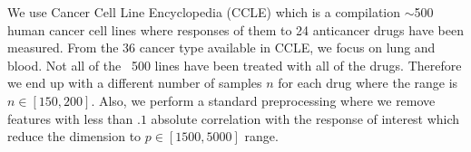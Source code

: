 We use Cancer Cell Line Encyclopedia (CCLE) \cite{barretina2012cancer} which is a compilation $\sim$500 human cancer cell lines where responses of them to 24 anticancer drugs have been measured.%
From the 36 cancer type available in CCLE, we focus on lung and blood.%
Not all of the ~500 lines have been treated with all of the drugs. 
Therefore we end up with a different number of samples $n$ for each drug where the range is $n \in [150, 200]$.
Also, we perform a standard preprocessing \cite{barretina2012cancer} where we remove features with less than $.1$ absolute correlation with the response of interest which reduce the dimension to $p \in [1500, 5000]$ range. 

